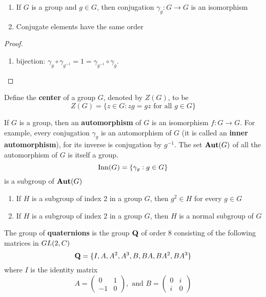 \documentclass[11pt]{article}
\begin{document}
\begin{proposition}[]
\begin{enumerate}
\item If \(G\) is a group and \(g\in G\), then conjugation \(\gamma_g:G\to G\) is an
isomorphism
\item Conjugate elements have the same order
\end{enumerate}
\end{proposition}

\begin{proof}
\begin{enumerate}
\item bijection: \(\gamma_g\circ\gamma_{g^{-1}}=1=\gamma_{g^{-1}}\circ\gamma_g\).
\end{enumerate}
\end{proof}

\begin{examplle}[]
Define the \textbf{center} of a group \(G\), denoted by \(Z(G)\), to be
\begin{equation*}
Z(G)=\{z\in G:zg=gz\text{ for all }g\in G\}
\end{equation*}
\end{examplle}

\begin{examplle}[]
If \(G\) is a group, then an \textbf{automorphism} of \(G\) is an isomorphism \(f:G\to G\).
For example, every conjugation \(\gamma_g\) is an automorphism of \(G\) (it is
called an \textbf{inner automorphism}), for its inverse is conjugation by \(g^{-1}\).
The set \(\operatorname{\textbf{Aut}}(G)\) of all the automorphism of \(G\) is itself a group.
\begin{equation*}
\operatorname{Inn}(G)=\{\gamma_g:g\in G\}
\end{equation*}
is a subgroup of \(\operatorname{\textbf{Aut}}(G)\)
\end{examplle}
\begin{proposition}[]
\begin{enumerate}
\item If \(H\) is a subgroup of index 2 in a group \(G\), then \(g^2\in H\) for every
\(g\in G\)
\item If \(H\) is a subgroup of index 2 in a group \(G\), then \(H\) is a normal
subgroup of \(G\)
\end{enumerate}
\end{proposition}


\begin{definition}[]
The group of \textbf{quaternions} is the group \(\operatorname{\textbf{Q}}\) of order 8 consisting of the
following matrices in \(GL(2, \relax{C})\)
\begin{equation*}
\operatorname{\textbf{Q}}=\{I,A,A^2,A^3,B,BA,BA^2,BA^3\}
\end{equation*}
where \(I\) is the identity matrix
\begin{equation*}
A=
\begin{pmatrix}
0&1\\
-1&0
\end{pmatrix}, \text{ and }
B=\begin{pmatrix}
0&i\\
i&0
  \end{pmatrix}
\end{equation*}
\end{definition}
\end{document}
